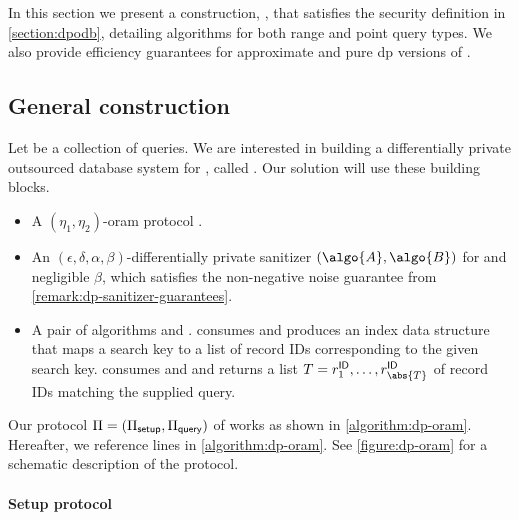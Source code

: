 \section{\texorpdfstring{\epsolute{}}{Epsolute}}\label{section:dp-oram}

	In this section we present a construction, \epsolute{}, that satisfies the security definition in \cref{section:dpodb}, detailing algorithms for both range and point query types.
	We also provide efficiency guarantees for approximate and pure \acrshort{dp} versions of \epsolute{}.

	\subsection{General construction}

		Let \querySet{} be a collection of queries.
		We are interested in building a differentially private outsourced database system for \querySet{}, called \epsolute{}.
		Our solution will use these building blocks.
		\begin{itemize}
			\item
				A $(\eta_1, \eta_2)$-\acrshort{oram} protocol .
			\item
				An $(\epsilon, \delta, \alpha, \beta)$-differentially private sanitizer $(\algo{A}, \algo{B})$ for \querySet{} and negligible $\beta$, which satisfies the non-negative noise guarantee from \cref{remark:dp-sanitizer-guarantees}.
			\item
				A pair of algorithms  and .
				 consumes \database{} and produces an index data structure \indexI{} that maps a search key \searchKey{} to a list of record IDs \recordID{} corresponding to the given search key.
				 consumes \indexI{} and \query{} and returns a list $T = \fromNtoM{\recordID}{1}{{\abs{T}}}$ of record IDs matching the supplied query.
		\end{itemize}

		Our protocol $\Pi = (\Pi_{\mathsf{setup}}, \Pi_{\mathsf{query}})$ of \epsolute{} works as shown in \cref{algorithm:dp-oram}.
		Hereafter, we reference lines in \cref{algorithm:dp-oram}.
		See \cref{figure:dp-oram} for a schematic description of the protocol.

		\paragraph*{Setup protocol \; \texorpdfstring{\protocolSetup{}}{}}

